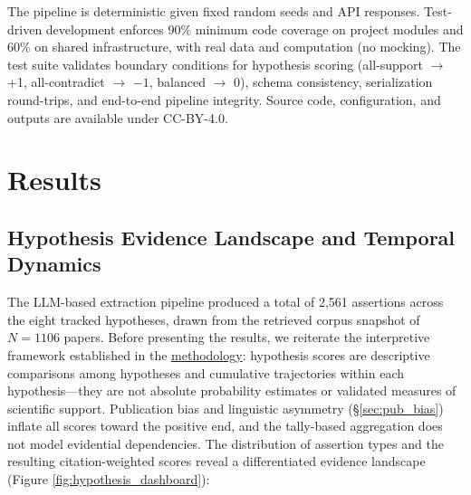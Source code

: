 \documentclass[
  english,
]{article}
\begin{document}
The pipeline is deterministic given fixed random seeds and API
responses. Test-driven development enforces 90\% minimum code coverage
on project modules and 60\% on shared infrastructure, with real data and
computation (no mocking). The test suite validates boundary conditions
for hypothesis scoring (all-support \(\to\) +1, all-contradict \(\to\)
\(-1\), balanced \(\to\) 0), schema consistency, serialization
round-trips, and end-to-end pipeline integrity. Source code,
configuration, and outputs are available under CC-BY-4.0.

\newpage

\section{Results}\label{sec:results}

\subsection{Hypothesis Evidence Landscape and Temporal
Dynamics}\label{sec:hypothesis_results}

The LLM-based extraction pipeline produced a total of 2,561 assertions
across the eight tracked hypotheses, drawn from the retrieved corpus
snapshot of \(N = 1106\) papers. Before presenting the results, we
reiterate the interpretive framework established in the
\hyperref[sec:methods_kg]{methodology}: hypothesis scores are
descriptive comparisons among hypotheses and cumulative trajectories
within each hypothesis---they are not absolute probability estimates or
validated measures of scientific support. Publication bias and
linguistic asymmetry (\S\ref{sec:pub_bias}) inflate all scores toward
the positive end, and the tally-based aggregation does not model
evidential dependencies. The distribution of assertion types and the
resulting citation-weighted scores reveal a differentiated evidence
landscape (Figure \ref{fig:hypothesis_dashboard}):
\end{document}
